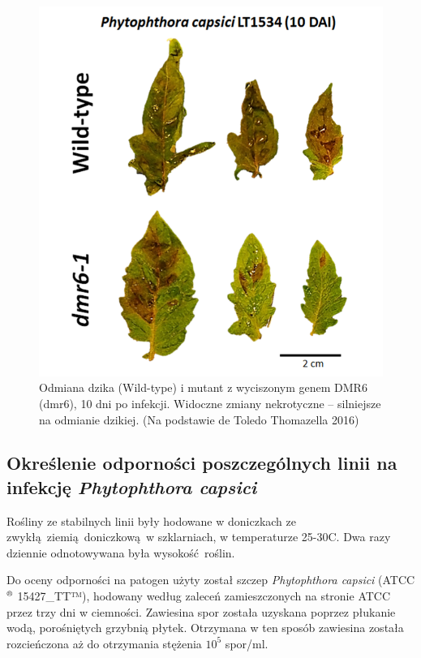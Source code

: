 \documentclass[two column, twoside, a4paper]{article}
\begin{document}
\begin{figure}[tp]
\begin{tcolorbox}
	\centering
	\includegraphics[width=\textwidth]{./figures/P_capsici_infection.png}
	\caption{Odmiana dzika (Wild-type) i mutant z wyciszonym genem DMR6 (dmr6), 10 dni po infekcji. Widoczne zmiany nekrotyczne -- silniejsze na odmianie dzikiej. (Na podstawie de Toledo Thomazella 2016)\autocite{deToledoThomazella2016}}\label{fig::p_capsici_infection}
\end{tcolorbox}
\end{figure}


\subsection{Określenie odporności poszczególnych linii na infekcję \textit{Phytophthora capsici}}

Rośliny ze stabilnych linii były hodowane w doniczkach ze zwykłą ziemią doniczkową w szklarniach, w temperaturze 25-30\degree C. Dwa razy dziennie odnotowywana była wysokość roślin.

Do oceny odporności na patogen użyty został szczep \textit{Phytophthora capsici} (ATCC$^{\text{\textregistered}}$ 15427\_TT™), hodowany według zaleceń zamieszczonych na stronie ATCC\autocite{ATCC} przez trzy dni w ciemności. Zawiesina spor została uzyskana poprzez płukanie wodą, porośniętych grzybnią płytek. Otrzymana w ten sposób zawiesina została rozcieńczona aż do otrzymania stężenia $10^{5}$ spor/ml.
\end{document}

